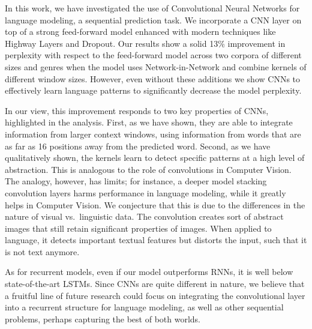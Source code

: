 In this work, we have investigated the use of Convolutional Neural
Networks for language modeling, a sequential prediction task.
We incorporate a CNN layer on top of a strong feed-forward model
enhanced with modern techniques like Highway Layers and Dropout. Our results
show a solid 13\% improvement in perplexity with respect to the
feed-forward model across two corpora of different sizes and genres 
when the model uses Network-in-Network 
and combine kernels of different window sizes. However, even without these additions
we show CNNs to effectively learn language patterns to significantly 
decrease the model perplexity.

In our view, this improvement responds to two key properties of CNNs,
highlighted in the analysis. First, as we have shown, they are able to
integrate information from larger context windows, using information
from words that are as far as 16 positions away from the predicted
word. Second, as we have qualitatively shown, the kernels learn to
detect specific patterns at a high level of abstraction. This is
analogous to the role of convolutions in Computer Vision. The analogy,
however, has limits; for instance, a deeper model stacking convolution
layers harms performance in language modeling, while it greatly helps
in Computer Vision. We conjecture that this is due to the differences
in the nature of visual vs.\ linguistic data. The convolution creates
sort of abstract images that still retain significant properties of
images. When applied to language, it detects important textual
features but distorts the input, such that it is not text anymore.

As for recurrent models, even if our model outperforms RNNs, it is
well below state-of-the-art LSTMs. Since CNNs are quite different in
nature, we believe that a fruitful line of future research could focus
on integrating the convolutional layer into a recurrent structure for
language modeling, as well as other sequential problems, perhaps
capturing the best of both worlds.


